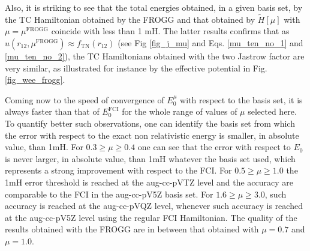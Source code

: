 \documentclass[aip,jcp,reprint,noshowkeys,superscriptaddress]{revtex4-1}
\newcommand{\mfrogg}[0]{\mu^\text{FROGG}}
\begin{document}
Also, it is striking to see that the total energies obtained, in a given basis set, by the TC Hamiltonian obtained by the FROGG and that obtained by $\tilde{H}[\mu]$ with $\mu=\mfrogg$ coincide with less than 1 mH. 
The latter results confirms that as $u(r_{12},\mfrogg) \approx f_{\text{TN}}(r_{12})$ (see Fig \ref{fig_j_mu} and Eqs. \eqref{mu_ten_no_1} and \eqref{mu_ten_no_2}), the TC Hamiltonians obtained with the two Jastrow factor are very similar, as illustrated for instance by the effective potential in Fig. \ref{fig_wee_frogg}. 

Coming now to the speed of convergence of $E_0^\mu$ with respect to the basis set, it is always faster than that of $E_0^\text{FCI}$ for the whole range of values of $\mu$ selected here. 
To quantify better such observations, one can identify the basis set from which the error with respect to the exact non relativistic energy is smaller, in absolute value, than 1mH. 
For $0.3\ge\mu\ge0.4$ one can see that the error with respect to $E_0$ is never larger, in absolute value, than 1mH whatever the basis set used, which represents a strong improvement with respect to the FCI. For $0.5\ge \mu \ge 1.0$ the 1mH error threshold is reached at the aug-cc-pVTZ level and the accuracy are comparable to the FCI in the aug-cc-pV5Z basis set. For $1.6\ge \mu \ge 3.0$, such accuracy is reached at the aug-cc-pVQZ level, whenever such accuracy is reached at the aug-cc-pV5Z level using the regular FCI Hamiltonian. 
The quality of the results obtained with the FROGG are in between that obtained with $\mu=0.7$ and $\mu=1.0$. 
\end{document}
